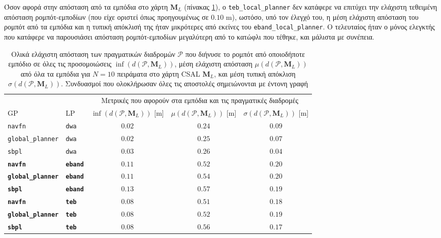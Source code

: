Όσον αφορά στην απόσταση από τα εμπόδια στο χάρτη $\bm{M}_L$ (πίνακας
\ref{tbl:info_ground_truth_map_csal}), ο \texttt{teb\_local\_planner} δεν
κατάφερε να επιτύχει την ελάχιστη τεθειμένη απόσταση ρομπότ-εμποδίων (που είχε
οριστεί όπως προηγουμένως σε $0.10$ m), ωστόσο, υπό τον έλεγχό του, η μέση
ελάχιστη απόσταση του ρομπότ από τα εμπόδια και η τυπική απόκλισή της ήταν
μικρότερες από εκείνες του \texttt{eband\_local\_planner}. Ο τελευταίος ήταν ο
μόνος ελεγκτής που κατάφερε να παρουσιάσει απόσταση ρομπότ-εμποδίων μεγαλύτερη
από το κατώφλι που τέθηκε, και μάλιστα με συνέπεια.

\begin{table}[h]\hspace{-0.5cm}
\renewcommand{\arraystretch}{1.3}
\begin{tabular}{llccc}
  & & \multicolumn{3}{c}{Μετρικές που αφορούν στα εμπόδια και τις πραγματικές διαδρομές} \\
  \cline{3-5}
  GP & LP & $\inf(d(\bm{\mathcal{P}},\bm{M}_L))$ [m] & $\mu(d(\bm{\mathcal{P}},\bm{M}_L))$ [m] & $\sigma(d(\bm{\mathcal{P}},\bm{M}_L))$ [m] \\ \toprule
  \texttt{navfn} & \texttt{dwa} & $0.02$ & $0.24$ & $0.09$ \\
  \texttt{global\_planner} & \texttt{dwa} & $0.02$ & $0.25$ & $0.07$ \\
  \texttt{sbpl} & \texttt{dwa} & $0.03$ & $0.26$ & $0.04$ \\
  \textbf{\texttt{navfn}} & \textbf{\texttt{eband}} & $\bm{0.11}$ & $\bm{0.52}$ & $\bm{0.20}$ \\
  \textbf{\texttt{global\_planner}} & \textbf{\texttt{eband}} & $\bm{0.11}$ & $\bm{0.54}$ & $\bm{0.20}$ \\
  \textbf{\texttt{sbpl}} & \textbf{\texttt{eband}} & $\bm{0.13}$ & $\bm{0.57}$ & $\bm{0.19}$ \\
  \textbf{\texttt{navfn}} & \textbf{\texttt{teb}} & $\bm{0.08}$ & $\bm{0.51}$ & $\bm{0.18}$ \\
  \textbf{\texttt{global\_planner}} & \textbf{\texttt{teb}} & $\bm{0.08}$ & $\bm{0.52}$ & $\bm{0.19}$ \\
  \textbf{\texttt{sbpl}} & \textbf{\texttt{teb}} & $\bm{0.08}$ & $\bm{0.56}$ & $\bm{0.17}$ \\ \bottomrule
\end{tabular}
\caption{\small Ολικά ελάχιστη απόσταση των πραγματικών διαδρομών
         $\bm{\mathcal{P}}$ που διήνυσε το ρομπότ από οποιοδήποτε εμπόδιο σε
         όλες τις προσομοιώσεις $\inf(d(\bm{\mathcal{P}},\bm{M}_L))$, μέση
         ελάχιστη απόσταση $\mu(d(\bm{\mathcal{P}},\bm{M}_L))$ από όλα τα
         εμπόδια για $N=10$ πειράματα στο χάρτη CSAL $\bm{M}_L$, και μέση τυπική απόκλιση
         $\sigma(d(\bm{\mathcal{P}},\bm{M}_L))$. Συνδυασμοί που
         ολοκλήρωσαν όλες τις αποστολές σημειώνονται με έντονη γραφή}
\label{tbl:info_ground_truth_map_csal}
\end{table}

